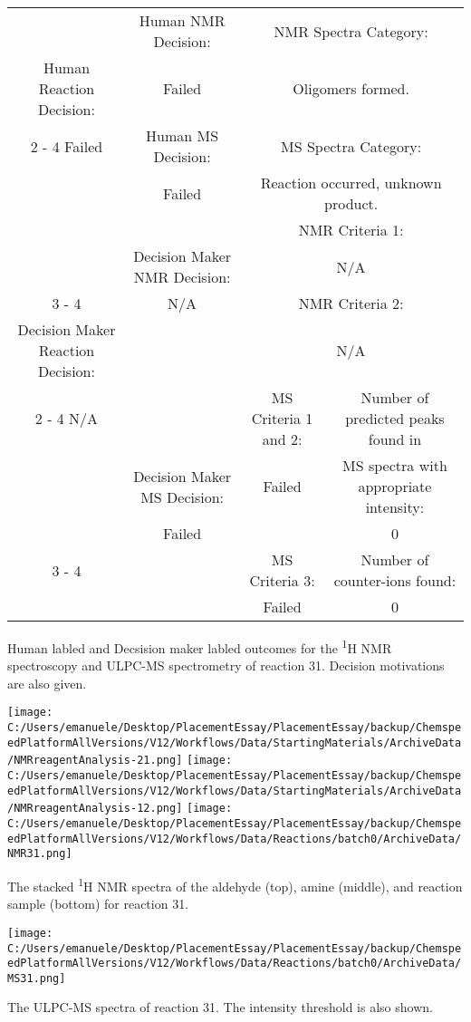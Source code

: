 \documentclass{article}%
\begin{document}
\begin{Decision Table}[H]%
\begin{tabular}{|c|c|c|c|}%
\hline%
&Human NMR Decision:&\multicolumn{2}{|c|}{NMR Spectra Category:}\\%
Human Reaction Decision:&Failed&\multicolumn{2}{|c|}{Oligomers formed.}\\%
\cline{2%
-%
4}%
Failed&Human MS Decision:&\multicolumn{2}{|c|}{MS Spectra Category:}\\%
&Failed&\multicolumn{2}{|c|}{Reaction occurred, unknown product.}\\%
\hline%
&&\multicolumn{2}{|c|}{NMR Criteria 1:}\\%
&Decision Maker NMR Decision:&\multicolumn{2}{|c|}{N/A}\\%
\cline{3%
-%
4}%
&N/A&\multicolumn{2}{|c|}{NMR Criteria 2:}\\%
Decision Maker Reaction Decision:&&\multicolumn{2}{|c|}{N/A}\\%
\cline{2%
-%
4}%
N/A&&MS Criteria 1 and 2:&Number of predicted peaks found in\\%
&Decision Maker MS Decision:&Failed&MS spectra with appropriate intensity:\\%
&Failed&&0\\%
\cline{3%
-%
4}%
&&MS Criteria 3:&Number of counter{-}ions found:\\%
&&Failed&0\\%
\hline%
\end{tabular}%
\caption{Human labled and Decsision maker labled outcomes for the \textsuperscript{1}H NMR spectroscopy and ULPC-MS spectrometry of reaction 31. Decision motivations are also given.}%
\end{Decision Table}%
\begin{NMR Spectra}[H]%
\begin{center}%
\texttt{[image: C:/Users/emanuele/Desktop/PlacementEssay/PlacementEssay/backup/ChemspeedPlatformAllVersions/V12/Workflows/Data/StartingMaterials/ArchiveData/NMRreagentAnalysis-21.png]}\hfill%
\texttt{[image: C:/Users/emanuele/Desktop/PlacementEssay/PlacementEssay/backup/ChemspeedPlatformAllVersions/V12/Workflows/Data/StartingMaterials/ArchiveData/NMRreagentAnalysis-12.png]}\hfill%
\texttt{[image: C:/Users/emanuele/Desktop/PlacementEssay/PlacementEssay/backup/ChemspeedPlatformAllVersions/V12/Workflows/Data/Reactions/batch0/ArchiveData/NMR31.png]}\hfill%
\end{center}%
\caption{The stacked \textsuperscript{1}H NMR spectra of the aldehyde (top), amine (middle), and reaction sample (bottom) for reaction 31.}%
\end{NMR Spectra}%
\begin{MS Spectra}[H]%
\begin{center}%
\texttt{[image: C:/Users/emanuele/Desktop/PlacementEssay/PlacementEssay/backup/ChemspeedPlatformAllVersions/V12/Workflows/Data/Reactions/batch0/ArchiveData/MS31.png]}\hfill%
\end{center}%
\caption{The ULPC-MS spectra of reaction 31. The intensity threshold is also shown.}%
\end{MS Spectra}%
\end{document}
